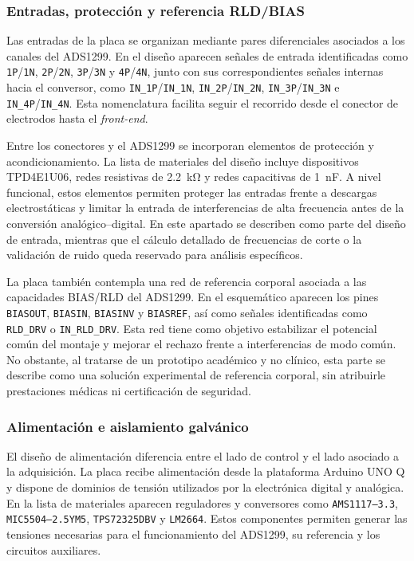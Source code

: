 \subsubsection{Entradas, protección y referencia RLD/BIAS}

Las entradas de la placa se organizan mediante pares diferenciales asociados a los canales del ADS1299. En el diseño aparecen señales de entrada identificadas como \texttt{1P}/\texttt{1N}, \texttt{2P}/\texttt{2N}, \texttt{3P}/\texttt{3N} y \texttt{4P}/\texttt{4N}, junto con sus correspondientes señales internas hacia el conversor, como \texttt{IN\_1P}/\texttt{IN\_1N}, \texttt{IN\_2P}/\texttt{IN\_2N}, \texttt{IN\_3P}/\texttt{IN\_3N} e \texttt{IN\_4P}/\texttt{IN\_4N}. Esta nomenclatura facilita seguir el recorrido desde el conector de electrodos hasta el \textit{front-end}.

Entre los conectores y el ADS1299 se incorporan elementos de protección y acondicionamiento. La lista de materiales del diseño incluye dispositivos TPD4E1U06, redes resistivas de \SI{2.2}{\kilo\ohm} y redes capacitivas de \SI{1}{\nano\farad}. A nivel funcional, estos elementos permiten proteger las entradas frente a descargas electrostáticas y limitar la entrada de interferencias de alta frecuencia antes de la conversión analógico--digital. En este apartado se describen como parte del diseño de entrada, mientras que el cálculo detallado de frecuencias de corte o la validación de ruido queda reservado para análisis específicos.

La placa también contempla una red de referencia corporal asociada a las capacidades BIAS/RLD del ADS1299. En el esquemático aparecen los pines \texttt{BIASOUT}, \texttt{BIASIN}, \texttt{BIASINV} y \texttt{BIASREF}, así como señales identificadas como \texttt{RLD\_DRV} o \texttt{IN\_RLD\_DRV}. Esta red tiene como objetivo estabilizar el potencial común del montaje y mejorar el rechazo frente a interferencias de modo común. No obstante, al tratarse de un prototipo académico y no clínico, esta parte se describe como una solución experimental de referencia corporal, sin atribuirle prestaciones médicas ni certificación de seguridad.

\subsubsection{Alimentación e aislamiento galvánico}

El diseño de alimentación diferencia entre el lado de control y el lado asociado a la adquisición. La placa recibe alimentación desde la plataforma Arduino UNO Q y dispone de dominios de tensión utilizados por la electrónica digital y analógica. En la lista de materiales aparecen reguladores y conversores como \texttt{AMS1117--3.3}, \texttt{MIC5504--2.5YM5}, \texttt{TPS72325DBV} y \texttt{LM2664}. Estos componentes permiten generar las tensiones necesarias para el funcionamiento del ADS1299, su referencia y los circuitos auxiliares.

